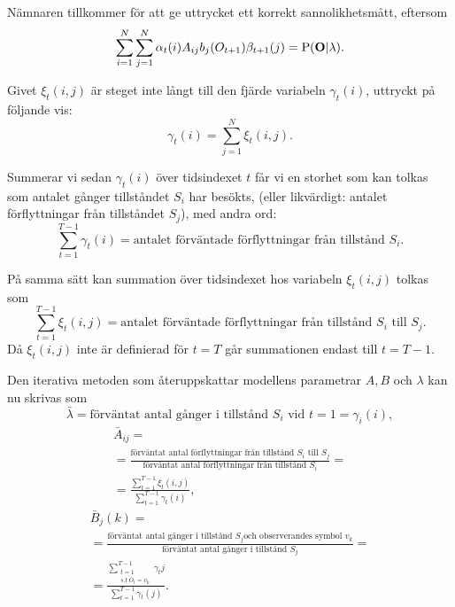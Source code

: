 \documentclass[../rapport_MVEX01-11-05]{subfiles}
\begin{document}
Nämnaren tillkommer för att ge uttrycket ett korrekt sannolikhetsmått, eftersom 
\begin{equation*}
\sum_{i=1}^N\sum_{j=1}^N\alpha_t(i)A_{ij}b_j(O_{t+1})\beta_{t+1}(j) = \mathrm{P}(\mathbf{O}|\lambda).
\end{equation*}

Givet $\xi_t(i,j)$ är steget inte långt till den fjärde variabeln
$\gamma_t(i)$, uttryckt på följande vis:
\begin{equation*}
\gamma_t(i) = \sum_{j=1}^N\xi_t(i,j).
\end{equation*}

Summerar vi sedan $\gamma_t(i)$ över tidsindexet $t$ får vi en storhet
som kan tolkas som antalet gånger tillståndet $S_i$ har besökts,
(eller likvärdigt: antalet förflyttningar från tillståndet $S_j$), med
andra ord:
\begin{equation*}
\sum_{t=1}^{T-1}\gamma_t(i) = \text{antalet förväntade förflyttningar
  från tillstånd $S_i$.}
\end{equation*} 

På samma sätt kan summation över tidsindexet hos variabeln
$\xi_t(i,j)$ tolkas som 
\begin{equation*}
\sum_{t=1}^{T-1}\xi_t(i,j) = \text{antalet förväntade förflyttningar
  från tillstånd $S_i$ till $S_j$}.
\end{equation*}
Då $\xi_t(i,j)$ inte är definierad för $t=T$ går summationen endast
till $t = T -1$.

Den iterativa metoden som återuppskattar modellens parametrar $A,B$
och $\lambda$ kan nu skrivas som
\begin{equation*}
\bar{\lambda} = \text{förväntat antal gånger i tillstånd $S_i$ vid
  $t=1$} = \gamma_i(i),
\end{equation*}
\begin{multline*}
\bar{A}_{ij} = \\ = \frac{\text{förväntat antal förflyttningar från
    tillstånd $S_i$ till $S_j$}}{\text{förväntat antal förflyttningar
    från tillstånd $S_i$}} = \\ =
\frac{\sum_{t=1}^{T-1}\xi_t(i,j)}{\sum_{t=1}^{T-1}\gamma_t(i)},
\end{multline*}
\begin{multline*}
\bar{B}_j(k) = \\ = \frac{\text{förväntat antal gånger i tillstånd $S_j$
    och observerandes symbol $v_k$}}{\text{förväntat antal gånger i
    tillstånd $S_j$}} = \\ = \frac{\sum_{\substack{t=1\\s.t~ O_t =
      v_k}}^{T-1}\gamma_t{j}}{\sum_{t=1}^{T-1}\gamma_t(j)}.
\end{multline*}
\end{document}
